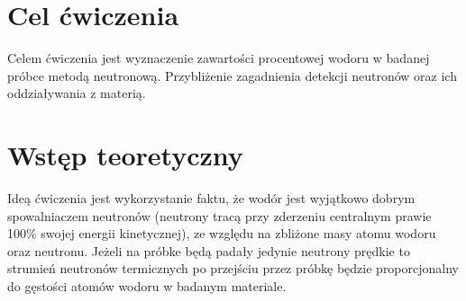 \documentclass{article}
\begin{document}
\section{Cel ćwiczenia}
Celem ćwiczenia jest wyznaczenie zawartości procentowej wodoru w badanej próbce metodą neutronową. Przybliżenie zagadnienia detekcji neutronów oraz ich oddziaływania z materią.
\section{Wstęp teoretyczny}
Ideą ćwiczenia jest wykorzystanie faktu, że wodór jest wyjątkowo dobrym spowalniaczem neutronów (neutrony tracą przy zderzeniu centralnym prawie 100\% swojej energii kinetycznej), ze względu na zbliżone masy atomu wodoru oraz neutronu. Jeżeli na próbke będą padały jedynie neutrony prędkie to strumień neutronów termicznych po przejściu przez próbkę będzie proporcjonalny do gęstości atomów wodoru w badanym materiale. \\
\end{document}
